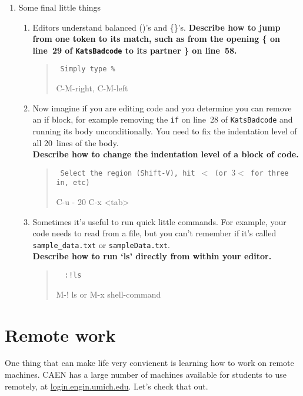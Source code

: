 \documentclass{article}
\begin{document}
\begin{enumerate}
\begin{quote}
      \end{quote}
  \item Some final little things
    \small
    \begin{enumerate}
      \item Editors understand balanced ()'s and \{\}'s.
        \textbf{Describe how to jump from one token to its match, such as from
          the opening \{ on line~29 of \texttt{KatsBadcode} to its partner \}
          on line~58.
        }
        \begin{quote}\tt
          \color{blue}Simply type \%

          \color{red} C-M-right, C-M-left
        \end{quote}
      \item Now imagine if you are editing code and you determine you can
        remove an if block, for example removing the \texttt{if} on line~28 of
        \texttt{KatsBadcode} and running its body unconditionally. You need to
        fix the indentation level of all 20~lines of the body.\\
        \textbf{Describe how to change the indentation level of a block of code.}
        \begin{quote}\tt
          \color{blue} Select the region (Shift-V), hit $<$ (or $3<$ for three in, etc)

          \color{red} C-u - 20 C-x <tab>
        \end{quote}
      \item Sometimes it's useful to run quick little commands. For example,
        your code needs to read from a file, but you can't remember if it's
        called \texttt{sample\_data.txt} or \texttt{sampleData.txt}.\\
        \textbf{Describe how to run `ls' directly from within your editor.}
        \begin{quote}\tt
          {\color{blue} :!ls}

          {\color{red} M-! ls} or {\color{red} M-x shell-command}
        \end{quote}
    \end{enumerate}
\end{enumerate}


\newpage
\section{Remote work}
One thing that can make life very convienent is learning how to work on remote
machines. CAEN has a large number of machines available for students to use
remotely, at \url{login.engin.umich.edu}. Let's check that out.
\end{document}
